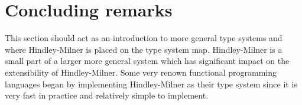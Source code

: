 \documentclass[11pt,oneside,a4paper]{report}
\begin{document}
\section{Concluding remarks}
This section should act as an introduction to more general type systems and where Hindley-Milner is placed on the type system map.
Hindley-Milner is a small part of a larger more general system which has significant impact on the extensibility of Hindley-Milner.
Some very renown functional programming languages began by implementing Hindley-Milner as their type system since it is very fast in practice and relatively simple to implement.
\end{document}
